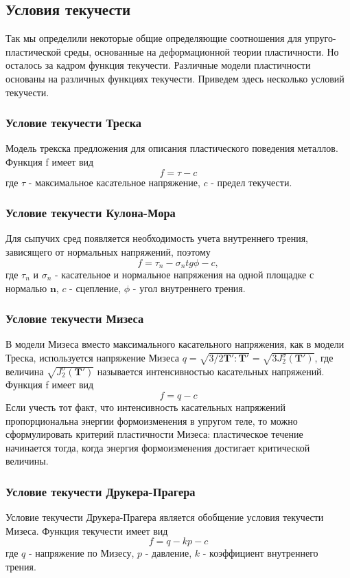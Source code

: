 \documentclass[12pt,a4paper, titlepage, openany]{book}
\begin{document}
\subsection*{Условия текучести}
Так мы определили некоторые общие определяющие соотношения для упруго-пластической среды, основанные на деформационной теории пластичности. Но осталось за кадром функция текучести. Различные модели пластичности основаны на различных функциях текучести. Приведем здесь несколько условий текучести.
\subsubsection*{Условие текучести Треска}
Модель трекска предложения для описания пластического поведения металлов. Функция f имеет вид
\begin{equation}
f = \tau - c
\end{equation}
где $\tau$ - максимальное касательное напряжение, $c$ - предел текучести.
\subsubsection*{Условие текучести Кулона-Мора}
Для сыпучих сред появляется необходимость учета внутреннего трения, зависящего от нормальных напряжений, поэтому 
\begin{equation}
f = \tau_n - \sigma_n tg \phi - c,
\end{equation}
где $\tau_n$ и $\sigma_n$ - касательное и нормальное напряжения на одной площадке с нормалью $\mathbf{n}$, $c$ - сцепление, $\phi$ - угол внутреннего трения.
\subsubsection*{Условие текучести Мизеса}
В модели Мизеса вместо максимального касательного напряжения, как в модели Треска, используется напряжение Мизеса $q = \sqrt{3/2 \mathbf{T'}:\mathbf{T'}} = \sqrt{3 J^{\sigma}_2 (\mathbf{T'})}$, где величина $\sqrt{J^{\sigma}_2 (\mathbf{T'})}$ называется интенсивностью касательных напряжений.
\\
Функция f имеет вид
\begin{equation}
f = q - c
\end{equation}
Если учесть тот факт, что интенсивность касательных напряжений пропорциональна энергии формоизменения в упругом теле, то можно сформулировать критерий пластичности Мизеса: пластическое течение начинается тогда, когда энергия формоизменения достигает критической величины.
\subsubsection*{Условие текучести Друкера-Прагера}
Условие текучести Друкера-Прагера является обобщение условия текучести Мизеса. Функция текучести имеет вид
\begin{equation}
f = q - kp - c
\end{equation}
где $q$ - напряжение по Мизесу, $p$ - давление, $k$ - коэффициент внутреннего трения.
\end{document}
